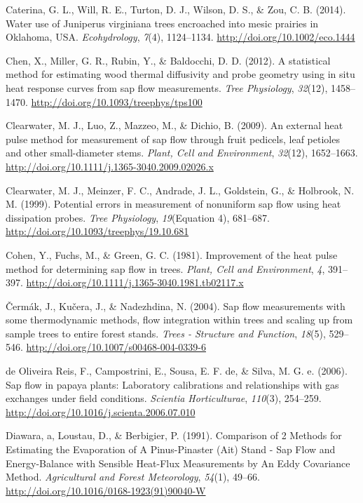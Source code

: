 \documentclass[11pt,twoside]{reedthesis}
\begin{document}
\hypertarget{ref-Caterina2014}{}
Caterina, G. L., Will, R. E., Turton, D. J., Wilson, D. S., \& Zou, C.
B. (2014). Water use of Juniperus virginiana trees encroached into mesic
prairies in Oklahoma, USA. \emph{Ecohydrology}, \emph{7}(4), 1124--1134.
\url{http://doi.org/10.1002/eco.1444}

\hypertarget{ref-Chen2012}{}
Chen, X., Miller, G. R., Rubin, Y., \& Baldocchi, D. D. (2012). A
statistical method for estimating wood thermal diffusivity and probe
geometry using in situ heat response curves from sap flow measurements.
\emph{Tree Physiology}, \emph{32}(12), 1458--1470.
\url{http://doi.org/10.1093/treephys/tps100}

\hypertarget{ref-Clearwater2009}{}
Clearwater, M. J., Luo, Z., Mazzeo, M., \& Dichio, B. (2009). An
external heat pulse method for measurement of sap flow through fruit
pedicels, leaf petioles and other small-diameter stems. \emph{Plant,
Cell and Environment}, \emph{32}(12), 1652--1663.
\url{http://doi.org/10.1111/j.1365-3040.2009.02026.x}

\hypertarget{ref-Clearwater1999}{}
Clearwater, M. J., Meinzer, F. C., Andrade, J. L., Goldstein, G., \&
Holbrook, N. M. (1999). Potential errors in measurement of nonuniform
sap flow using heat dissipation probes. \emph{Tree Physiology},
\emph{19}(Equation 4), 681--687.
\url{http://doi.org/10.1093/treephys/19.10.681}

\hypertarget{ref-Cohen1981}{}
Cohen, Y., Fuchs, M., \& Green, G. C. (1981). Improvement of the heat
pulse method for determining sap flow in trees. \emph{Plant, Cell and
Environment}, \emph{4}, 391--397.
\url{http://doi.org/10.1111/j.1365-3040.1981.tb02117.x}

\hypertarget{ref-Cermak2004}{}
Čermák, J., Kučera, J., \& Nadezhdina, N. (2004). Sap flow measurements
with some thermodynamic methods, flow integration within trees and
scaling up from sample trees to entire forest stands. \emph{Trees -
Structure and Function}, \emph{18}(5), 529--546.
\url{http://doi.org/10.1007/s00468-004-0339-6}

\hypertarget{ref-DeOliveiraReis2006}{}
de Oliveira Reis, F., Campostrini, E., Sousa, E. F. de, \& Silva, M. G.
e. (2006). Sap flow in papaya plants: Laboratory calibrations and
relationships with gas exchanges under field conditions. \emph{Scientia
Horticulturae}, \emph{110}(3), 254--259.
\url{http://doi.org/10.1016/j.scienta.2006.07.010}

\hypertarget{ref-Diawara1991}{}
Diawara, a, Loustau, D., \& Berbigier, P. (1991). Comparison of 2
Methods for Estimating the Evaporation of A Pinus-Pinaster (Ait) Stand -
Sap Flow and Energy-Balance with Sensible Heat-Flux Measurements by An
Eddy Covariance Method. \emph{Agricultural and Forest Meteorology},
\emph{54}(1), 49--66. \url{http://doi.org/10.1016/0168-1923(91)90040-W}
\end{document}
